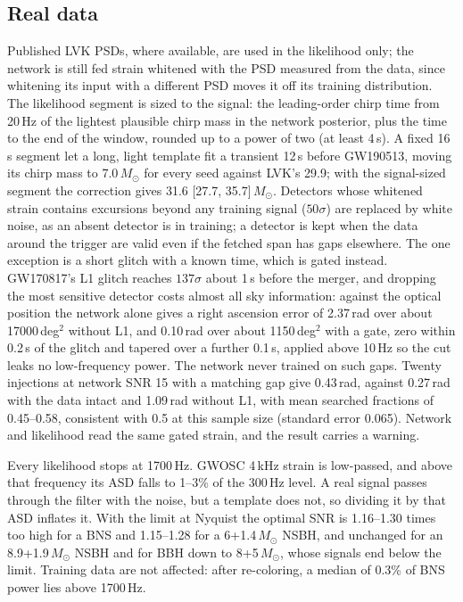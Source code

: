 \documentclass[twocolumn,linenumbers]{aastex701}
\newcommand{\msun}{M_{\odot}}
\begin{document}
\subsection{Real data}

Published LVK PSDs, where available, are used in the likelihood only; the
network is still fed strain whitened with the PSD measured from the data,
since whitening its input with a different PSD moves it off its training
distribution. The likelihood segment is sized to the signal: the
leading-order chirp time from 20\,Hz of the lightest plausible chirp mass in
the network posterior, plus the time to the end of the window, rounded up to a
power of two (at least 4\,s). A fixed 16\,s segment let a long, light template
fit a transient 12\,s before GW190513, moving its chirp mass to 7.0\,$\msun$
for every seed against LVK's 29.9; with the signal-sized segment the
correction gives 31.6 [27.7, 35.7]\,$\msun$. Detectors whose whitened strain
contains excursions beyond any training signal ($50\sigma$) are replaced by
white noise, as an absent detector is in training; a detector is kept when
the data around the trigger are valid even if the fetched span has gaps
elsewhere. The one exception is a short glitch with a known time, which is gated instead.
GW170817's L1 glitch reaches $137\sigma$ about 1\,s before the merger, and dropping the
most sensitive detector costs almost all sky information: against the optical position
\citep{Abbott2017GW170817} the network alone gives a right ascension error of 2.37\,rad over about
17000\,deg$^2$ without L1, and 0.10\,rad over about 1150\,deg$^2$ with a gate, zero within
0.2\,s of the glitch and tapered over a further 0.1\,s, applied above 10\,Hz so the cut
leaks no low-frequency power. The network never trained on such gaps. Twenty injections at
network SNR 15 with a matching gap give 0.43\,rad, against 0.27\,rad with the data
intact and 1.09\,rad without L1, with mean searched fractions of 0.45--0.58, consistent with 0.5 at this sample size (standard error 0.065). Network and likelihood read the
same gated strain, and the result carries a warning.

Every likelihood stops at 1700\,Hz. GWOSC 4\,kHz strain is low-passed, and above that
frequency its ASD falls to 1--3\% of the 300\,Hz level. A real signal passes through the
filter with the noise, but a template does not, so dividing it by that ASD inflates it. With
the limit at Nyquist the optimal SNR is 1.16--1.30 times too high for a BNS and 1.15--1.28
for a 6+1.4\,$\msun$ NSBH, and unchanged for an 8.9+1.9\,$\msun$ NSBH and for BBH down to
8+5\,$\msun$, whose signals end below the limit. Training data are not affected: after
re-coloring, a median of 0.3\% of BNS power lies above 1700\,Hz.
\end{document}
